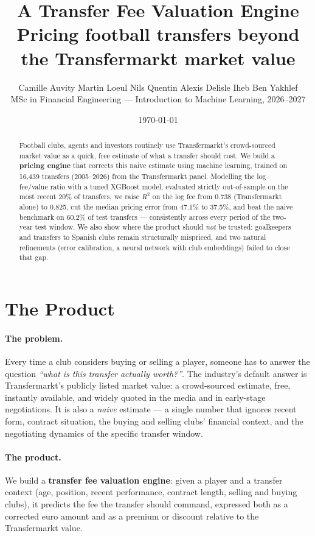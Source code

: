 \documentclass[11pt]{article}
\title{\vspace{-1.5cm}\textbf{A Transfer Fee Valuation Engine}\\[2mm]
\large Pricing football transfers beyond the Transfermarkt market value}
\author{%
Camille Auvity \quad Martin Loeul \quad Nils Quentin \quad Alexis Delisle \quad Iheb Ben Yakhlef \\[1mm]
\small MSc in Financial Engineering --- Introduction to Machine Learning, 2026--2027
}
\date{\today}
\begin{document}
\maketitle
\thispagestyle{fancy}
\vspace{-0.8cm}

\begin{abstract}
\noindent
Football clubs, agents and investors routinely use Transfermarkt's crowd\nobreakdash-sourced
market value as a quick, free estimate of what a transfer should cost. We build a
\textbf{pricing engine} that corrects this naive estimate using machine learning,
trained on 16{,}439 transfers (2005--2026) from the Transfermarkt panel. Modelling
the log fee\slash value ratio with a tuned XGBoost model, evaluated strictly
out\nobreakdash-of\nobreakdash-sample on the most recent 20\% of transfers, we
raise $R^2$ on the log fee from 0.738 (Transfermarkt alone) to 0.825, cut the
median pricing error from 47.1\% to 37.5\%, and beat the naive benchmark on
60.2\% of test transfers --- consistently across every period of the two-year
test window. We also show where the product should \emph{not} be trusted:
goalkeepers and transfers to Spanish clubs remain structurally mispriced, and
two natural refinements (error calibration, a neural network with club
embeddings) failed to close that gap.
\end{abstract}

\section{The Product}

\paragraph{The problem.} Every time a club considers buying or selling a player,
someone has to answer the question \emph{``what is this transfer actually
worth?''}. The industry's default answer is Transfermarkt's publicly listed
market value: a crowd-sourced estimate, free, instantly available, and
widely quoted in the media and in early-stage negotiations. It is also a
\emph{naive} estimate --- a single number that ignores recent form, contract
situation, the buying and selling clubs' financial context, and the
negotiating dynamics of the specific transfer window.

\paragraph{The product.} We build a \textbf{transfer fee valuation engine}: given
a player and a transfer context (age, position, recent performance, contract
length, selling and buying clubs), it predicts the fee the transfer should
command, expressed both as a corrected euro amount and as a premium or
discount relative to the Transfermarkt value.
\end{document}
